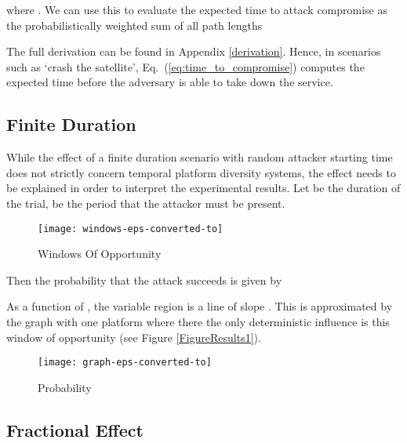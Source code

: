 \documentclass{acm_proc_article-sp}
\begin{document}
where .  We can use this to evaluate the expected time  to attack compromise
as the probabilistically weighted sum of all path lengths

The full derivation can be found in Appendix \ref{derivation}. Hence, in scenarios such as `crash the satellite', Eq.~(\ref{eq:time_to_compromise}) computes the expected time before the adversary is able to take down the service.

\subsection{Finite Duration}
\label{fd}

While the effect of a finite duration scenario with random attacker
starting time does not strictly concern temporal platform diversity systems, the effect
needs to be explained in order to interpret the experimental results.
Let  be the duration of the trial,  be the period that the
attacker must be present.

\begin{figure}[t]
\begin{centering}
\texttt{[image: windows-eps-converted-to]}
\par\end{centering}

\caption{Windows Of Opportunity}
\label{window}
\end{figure}


Then the probability that the attack succeeds is given by 




As a function of , the variable region is a line of slope .
This is approximated by the graph with one platform where there the
only deterministic influence is this window of opportunity (see Figure
\ref{FigureResults1}).

\begin{figure}[t]
\begin{centering}
\texttt{[image: graph-eps-converted-to]}
\par\end{centering}

\caption{Probability}
\label{baseline}
\end{figure}

\subsection{Fractional Effect}
\label{fe}
\end{document}
